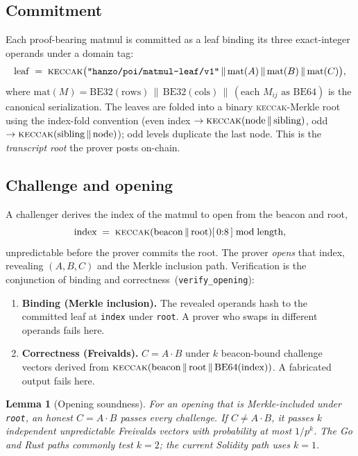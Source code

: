 \documentclass[11pt,a4paper]{article}
\newtheorem{lemma}{Lemma}
\begin{document}
\subsection{Commitment}

Each proof-bearing matmul is committed as a leaf binding its three exact-integer operands under a domain tag:
\[
  \mathrm{leaf} \;=\; \textsc{keccak}\big(\texttt{"hanzo/poi/matmul-leaf/v1"} \,\|\, \mathrm{mat}(A) \,\|\, \mathrm{mat}(B) \,\|\, \mathrm{mat}(C)\big),
\]
where $\mathrm{mat}(M) = \mathrm{BE32}(\text{rows}) \,\|\, \mathrm{BE32}(\text{cols}) \,\|\, (\text{each } M_{ij} \text{ as } \mathrm{BE64})$ is the canonical serialization. The leaves are folded into a binary \textsc{keccak}-Merkle root using the index-fold convention (even index $\to \textsc{keccak}(\text{node}\,\|\,\text{sibling})$, odd $\to \textsc{keccak}(\text{sibling}\,\|\,\text{node})$); odd levels duplicate the last node. This is the \emph{transcript root} the prover posts on-chain.

\subsection{Challenge and opening}

A challenger derives the index of the matmul to open from the beacon and root,
\[
  \text{index} \;=\; \textsc{keccak}(\text{beacon} \,\|\, \text{root})[\,0{:}8\,] \bmod \text{length},
\]
unpredictable before the prover commits the root. The prover \emph{opens} that index, revealing $(A,B,C)$ and the Merkle inclusion path. Verification is the conjunction of binding and correctness~(\texttt{verify\_opening}):
\begin{enumerate}
  \item \textbf{Binding (Merkle inclusion).} The revealed operands hash to the committed leaf at \texttt{index} under \texttt{root}. A prover who swaps in different operands fails here.
  \item \textbf{Correctness (Freivalds).} $C = A\cdot B$ under $k$ beacon-bound challenge vectors derived from $\textsc{keccak}(\text{beacon}\,\|\,\text{root}\,\|\,\mathrm{BE64}(\text{index}))$. A fabricated output fails here.
\end{enumerate}

\begin{lemma}[Opening soundness]\label{lem:opening}
For an opening that is Merkle-included under \texttt{root}, an honest $C=A\cdot B$ passes every challenge. If $C\neq A\cdot B$, it passes $k$ independent unpredictable Freivalds vectors with probability at most $1/p^k$. The Go and Rust paths commonly test $k=2$; the current Solidity path uses $k=1$.
\end{lemma}
\end{document}
